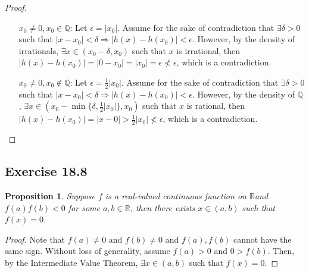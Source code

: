\documentclass{article}
\newtheorem{proposition}[thm]{Proposition}
\renewcommand*{\implies}{\ensuremath{\Longrightarrow}}
\newcommand*{\Q}{\ensuremath{\mathbb{Q}}}
\newcommand*{\R}{\ensuremath{\mathbb{R}}}
\begin{document}
\begin{enumerate}[label=(\alph*)]
\begin{proof}
\begin{enumerate}
            \item [$x_0\neq 0, x_0\in\Q$:] Let $\epsilon=|x_0|$. Assume for the sake of 
            contradiction that $\exists \delta>0$ such that $|x-x_0|<\delta\implies |h(x)-h(x_0)|
            <\epsilon$. However, by the density of irrationals, $\exists x\in (x_0-\delta, x_0)$
            such that $x$ is irrational, then $|h(x)-h(x_0)|=|0-x_0|=|x_0|=\epsilon\not<\epsilon$, 
            which is a contradiction.

            \item [$x_0\neq 0, x_0\notin\Q$:] Let $\epsilon=\frac{1}{2}|x_0|$. Assume for the sake 
            of contradiction that $\exists \delta>0$ such that $|x-x_0|<\delta\implies |h(x)-h(x_0)|
            <\epsilon$. However, by the density of $\Q$, $\exists x\in (x_0-\min\{\delta,\frac{1}{2}|x_0|\},
            x_0)$ such that $x$ is rational, then $|h(x)-h(x_0)|=|x-0|>\frac{1}{2}|x_0|
            \not <\epsilon$, which is a contradiction.
        \end{enumerate}
    \end{proof}
\end{enumerate}

\subsection*{Exercise 18.8}
\begin{proposition}
    Suppose $f$ is a real-valued continuous function on \R and $f(a)f(b)<0$ for some $a,b\in\R$, 
    then there exists $x\in (a,b)$ such that $f(x)=0$.
\end{proposition}
\begin{proof}
    Note that $f(a)\neq 0$ and $f(b)\neq 0$ and $f(a), f(b)$ cannot have the same sign. 
    Without loss of generality, assume $f(a)>0$ and $0>f(b)$. Then, by the Intermediate Value
    Theorem, $\exists x\in (a,b)$ such that $f(x)=0$.
\end{proof}
\end{document}
